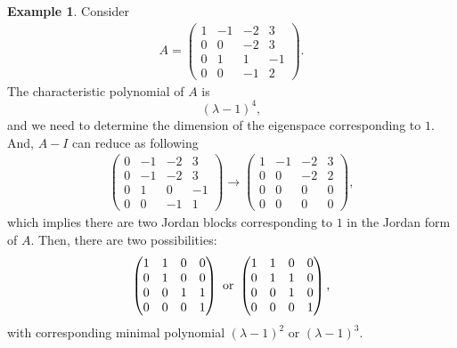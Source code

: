 \documentclass[11pt]{book}
\theoremstyle{definition}
\newtheorem{example}{Example}[chapter]
\numberwithin{equation}{chapter}
\begin{document}
\begin{example}
Consider
\begin{align*}
    A = \begin{pmatrix}
    1 & -1 & -2 & 3 \\
    0 & 0 & -2 & 3 \\
    0 & 1 & 1 & -1 \\
    0 & 0 & -1 & 2
    \end{pmatrix}.
\end{align*}
The characteristic polynomial of $A$ is 
$$(\lambda - 1)^4,$$
and we need to determine the dimension of the eigenspace corresponding to $1$. And, $A - I$ can reduce as following
\begin{align*}
    \begin{pmatrix}
    0 & -1 & -2 & 3 \\
    0 & -1 & -2 & 3 \\
    0 & 1 & 0 & -1 \\
    0 & 0 & -1 & 1
    \end{pmatrix} \to \begin{pmatrix}
    1 & -1 & -2 & 3 \\
    0 & 0 & -2 & 2 \\
    0 & 0 & 0 & 0 \\
    0 & 0 & 0 & 0
    \end{pmatrix},
\end{align*}
which implies there are two Jordan blocks corresponding to $1$ in the Jordan form of $A$. Then, there are two possibilities:
\begin{align*}
    \begin{pmatrix}
    1 & 1 & 0 & 0 \\
    0 & 1 & 0 & 0 \\
    0 & 0 & 1 & 1 \\
    0 & 0 & 0 & 1
    \end{pmatrix}\,\, {\rm or}\,\, \begin{pmatrix}
    1 & 1 & 0 & 0 \\
    0 & 1 & 1 & 0 \\
    0 & 0 & 1 & 0 \\
    0 & 0 & 0 & 1
    \end{pmatrix},
\end{align*}
with corresponding minimal polynomial $(\lambda - 1)^2$ or $(\lambda - 1)^3$.


\end{example}
\end{document}
